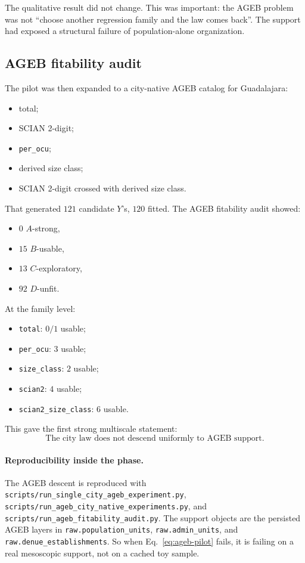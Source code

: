 \documentclass[11pt]{article}
\begin{document}
The qualitative result did not change. This was important: the AGEB problem was not ``choose another regression family and the law comes back''. The support had exposed a structural failure of population-alone organization.

\subsection{AGEB fitability audit}

The pilot was then expanded to a city-native AGEB catalog for Guadalajara:
\begin{itemize}
\item total;
\item SCIAN 2-digit;
\item \texttt{per\_ocu};
\item derived size class;
\item SCIAN 2-digit crossed with derived size class.
\end{itemize}

That generated \(121\) candidate \(Y\)'s, \(120\) fitted. The AGEB fitability audit showed:
\begin{itemize}
\item \(0\) \(A\)-strong,
\item \(15\) \(B\)-usable,
\item \(13\) \(C\)-exploratory,
\item \(92\) \(D\)-unfit.
\end{itemize}

At the family level:
\begin{itemize}
\item \texttt{total}: \(0/1\) usable;
\item \texttt{per\_ocu}: \(3\) usable;
\item \texttt{size\_class}: \(2\) usable;
\item \texttt{scian2}: \(4\) usable;
\item \texttt{scian2\_size\_class}: \(6\) usable.
\end{itemize}

This gave the first strong multiscale statement:
\begin{equation}
\text{The city law does not descend uniformly to AGEB support.}
\end{equation}

\paragraph{Reproducibility inside the phase.}
The AGEB descent is reproduced with
\texttt{scripts/run\_single\_city\_ageb\_experiment.py},
\texttt{scripts/run\_ageb\_city\_native\_experiments.py},
and
\texttt{scripts/run\_ageb\_fitability\_audit.py}.
The support objects are the persisted AGEB layers in
\texttt{raw.population\_units},
\texttt{raw.admin\_units},
and
\texttt{raw.denue\_establishments}.
So when Eq.~\eqref{eq:ageb-pilot} fails, it is failing on a real mesoscopic support, not on a cached toy sample.
\end{document}
